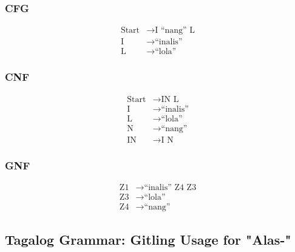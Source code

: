 \subsubsection{CFG}
\begin{equation*}
    \begin{aligned}
        \text{Start}   & \rightarrow \text{I “nang” L}   \\
        \text{I} & \rightarrow \text{“inalis”} \\
        \text{L} & \rightarrow \text{“lola”}
    \end{aligned}
\end{equation*}

\subsubsection{CNF}
\begin{equation*}
    \begin{aligned}
        \text{Start}   & \rightarrow \text{IN L}   \\
        \text{I} & \rightarrow \text{“inalis”} \\
        \text{L} & \rightarrow \text{“lola”} \\
        \text{N} & \rightarrow \text{“nang”} \\
        \text{IN} & \rightarrow \text{I N}
    \end{aligned}
\end{equation*}

\subsubsection{GNF}
\begin{equation*}
    \begin{aligned}
        \text{Z1}   & \rightarrow \text{“inalis” Z4 Z3}   \\
        \text{Z3} & \rightarrow \text{“lola”} \\
        \text{Z4} & \rightarrow \text{“nang”}
    \end{aligned}
\end{equation*}

\newpage
\subsection{Tagalog Grammar: Gitling Usage for "Alas-"}
